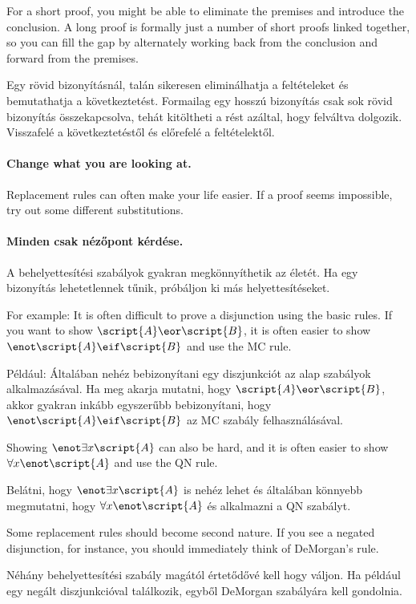 For a short proof, you might be able to eliminate the premises and introduce the conclusion. A long proof is formally just a number of short proofs linked together, so you can fill the gap by alternately working back from the conclusion and forward from the premises.

Egy rövid bizonyításnál, talán sikeresen eliminálhatja a feltételeket és bemutathatja a következtetést. Formailag egy hosszú bizonyítás csak sok rövid bizonyítás összekapcsolva, tehát kitöltheti a rést azáltal, hogy felváltva dolgozik. Visszafelé a következtetéstől és előrefelé a feltételektől. 

\paragraph{Change what you are looking at.}
Replacement rules can often make your life easier. If a proof seems impossible, try out some different substitutions.

\paragraph{Minden csak nézőpont kérdése.}
A behelyettesítési szabályok gyakran megkönnyíthetik az életét. Ha egy bizonyítás lehetetlennek tűnik, próbáljon ki más helyettesítéseket.

For example: It is often difficult to prove a disjunction using the basic rules. If you want to show $\script{A}\eor\script{B}$, it is often easier to show $\enot\script{A}\eif\script{B}$ and use the MC rule.

Például: Általában nehéz bebizonyítani egy diszjunkciót az alap szabályok alkalmazásával. Ha meg akarja mutatni, hogy $\script{A}\eor\script{B}$, akkor gyakran inkább egyszerűbb bebizonyítani, hogy $\enot\script{A}\eif\script{B}$ az MC szabály felhasználásával.

Showing $\enot \exists x\script{A}$ can also be hard, and it is often easier to show  $\forall x\enot \script{A}$ and use the QN rule.

Belátni, hogy $\enot \exists x\script{A}$ is nehéz lehet és általában könnyebb megmutatni, hogy $\forall x\enot \script{A}$ és alkalmazni a QN szabályt.

Some replacement rules should become second nature. If you see a negated disjunction, for instance, you should immediately think of DeMorgan's rule.

Néhány behelyettesítési szabály magától értetődővé kell hogy váljon. Ha például egy negált diszjunkcióval találkozik, egyből DeMorgan szabályára kell gondolnia.

